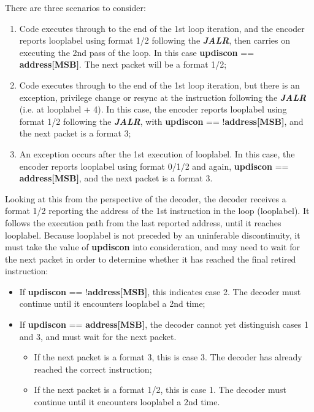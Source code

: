 There are three scenarios to consider:

\begin{enumerate}
  \item Code executes through to the end of the 1st loop iteration, and the encoder reports looplabel using format 1/2 following 
    the \textbf{\textit{JALR}}, then carries on executing the 2nd pass of the loop.  In this case \textbf{updiscon} == \textbf{address[MSB]}.  
    The next packet will be a format 1/2;
  \item Code executes through to the end of the 1st loop iteration, but there is an exception, privilege change or resync at
    the instruction following the \textbf{\textit{JALR}} (i.e. at looplabel + 4).  In this case, the encoder reports looplabel using 
    format 1/2 following the \textbf{\textit{JALR}}, with \textbf{updiscon} == !\textbf{address[MSB]}, and the next packet is a 
    format 3;
  \item An exception occurs after the 1st execution of looplabel.  In this case, the encoder reports looplabel using format 0/1/2 and again,
    \textbf{updiscon} == \textbf{address[MSB]}, and the next packet is a format 3.
\end{enumerate}

Looking at this from the perspective of the decoder, the decoder receives a format 1/2 reporting the address of the 1st instruction in the 
loop (looplabel).  It follows the execution path from the last reported address, until it reaches looplabel.  Because looplabel is not 
preceded by an uninferable discontinuity, it must take the value of \textbf{updiscon} into consideration, and may need to wait for the 
next packet in order to determine whether it has reached the final retired instruction:
\begin{itemize}  
  \item If \textbf{updiscon} == !\textbf{address[MSB]}, this indicates case 2.  The decoder must continue until it encounters 
    looplabel a 2nd time;
  \item If \textbf{updiscon} == \textbf{address[MSB]}, the decoder cannot yet distinguish cases 1 and 3, and must wait for the 
    next packet.
    \begin{itemize}
      \item If the next packet is a format 3, this is case 3.  The decoder has already reached the correct instruction;
      \item If the next packet is a format 1/2, this is case 1.  The decoder must continue until it encounters 
        looplabel a 2nd time.
    \end{itemize}
\end{itemize}

